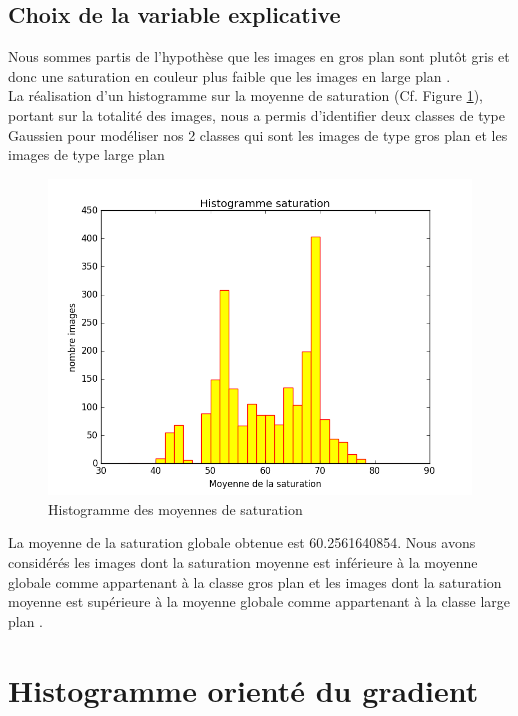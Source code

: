 \documentclass{book}
\begin{document}
\subsection{Choix de la variable explicative}

Nous sommes partis de l’hypothèse que les images en \og gros plan \fg{} sont plutôt gris et donc une saturation en couleur plus faible que les images en \og large plan \fg{}.\\
La réalisation d’un histogramme sur la moyenne de saturation (Cf. Figure \ref{hue_histo}), portant sur la totalité des images, nous a permis d’identifier deux classes de type Gaussien pour modéliser nos 2 classes
qui sont les images de type \og gros plan \fg{} et les images de type \og large plan \fg{}\\
\label{hue_frontiere}
\begin{figure}[H]
\begin{center}
\includegraphics[scale=0.5]{hue_histogramme.jpg}
\end{center}
\caption{Histogramme des moyennes de saturation}
\label{hue_histo}
\end{figure}

La moyenne de la saturation globale obtenue est 60.2561640854. 
Nous avons considérés les images dont la saturation moyenne est inférieure à la moyenne globale comme appartenant à la classe \og gros plan \fg{} et les images dont 
la saturation moyenne est supérieure à la moyenne globale comme appartenant à la classe \og large plan \fg{}.

\section{Histogramme orienté du gradient}
\end{document}
